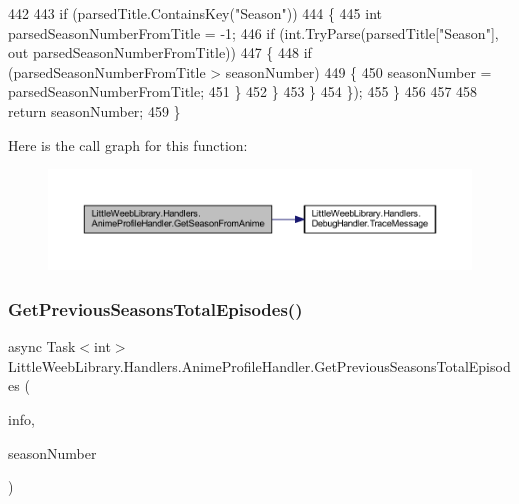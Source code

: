 \begin{DoxyCode}
442 
443                     \textcolor{keywordflow}{if} (parsedTitle.ContainsKey(\textcolor{stringliteral}{"Season"}))
444                     \{
445                         \textcolor{keywordtype}{int} parsedSeasonNumberFromTitle = -1;
446                         \textcolor{keywordflow}{if} (\textcolor{keywordtype}{int}.TryParse(parsedTitle[\textcolor{stringliteral}{"Season"}], out parsedSeasonNumberFromTitle))
447                         \{
448                             \textcolor{keywordflow}{if} (parsedSeasonNumberFromTitle > seasonNumber)
449                             \{
450                                 seasonNumber = parsedSeasonNumberFromTitle;
451                             \}
452                         \}
453                     \}
454                 \});
455             \}
456             
457 
458             \textcolor{keywordflow}{return} seasonNumber;
459         \}
\end{DoxyCode}
Here is the call graph for this function\+:\nopagebreak
\begin{figure}[H]
\begin{center}
\leavevmode
\includegraphics[width=350pt]{class_little_weeb_library_1_1_handlers_1_1_anime_profile_handler_ad7341acd9da86cd5cee9a45b0a41f887_cgraph}
\end{center}
\end{figure}
\mbox{\label{class_little_weeb_library_1_1_handlers_1_1_anime_profile_handler_a4fc9722b5a07b62c081a75873934682e}} 
\subsubsection{\texorpdfstring{Get\+Previous\+Seasons\+Total\+Episodes()}{GetPreviousSeasonsTotalEpisodes()}}
{\footnotesize\ttfamily async Task$<$int$>$ Little\+Weeb\+Library.\+Handlers.\+Anime\+Profile\+Handler.\+Get\+Previous\+Seasons\+Total\+Episodes (\begin{DoxyParamCaption}\item[{\mbox{\hyperlink{class_little_weeb_library_1_1_models_1_1_json_kitsu_anime_info}{Json\+Kitsu\+Anime\+Info}}}]{info,  }\item[{int}]{season\+Number }\end{DoxyParamCaption})\hspace{0.3cm}{\ttfamily [private]}}



